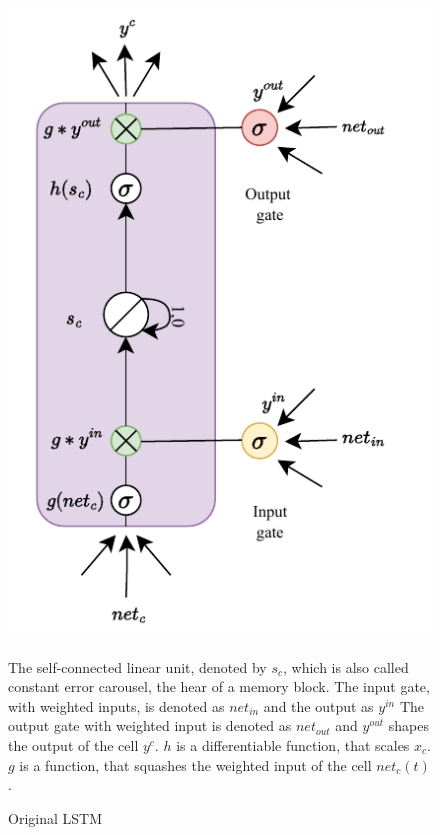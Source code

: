 \begin{figure}[htb]
\begin{minipage}{7.5cm}
 \centering
   \includegraphics[width=\linewidth]{Abschlussarbeit/Pictures/LSTMoriginal.pdf}
   \caption{Original \ac{LSTM} \cite{LSTM}}
   \label{fig:LSTM}
\end{minipage}
\hfill
\begin{minipage}{6.5cm}

The self-connected linear unit, denoted by $s_c$, which is also called constant error carousel, the hear of a memory block.
The input gate, with weighted inputs, is denoted as $net_{in}$ and the output as $y^{in}$
The output gate with weighted input is denoted as $net_{out}$ and $y^{out}$ shapes the output of the cell $y^c$.
$h$ is a differentiable function, that scales $x_c$.
$g$ is a function, that squashes the weighted input of the cell $net_{c}(t)$.
\end{minipage}
\end{figure}


